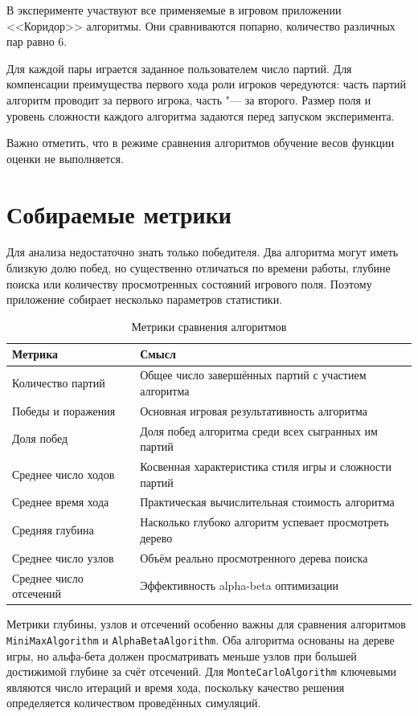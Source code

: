 \documentclass[a4paper,12pt]{diplom}
\begin{document}
В эксперименте участвуют все применяемые в игровом приложении <<Коридор>> алгоритмы. Они сравниваются попарно, количество различных пар равно $6$.

Для каждой пары играется заданное пользователем число партий. Для компенсации преимущества первого хода роли игроков чередуются: часть партий алгоритм проводит за первого игрока, часть "--- за второго. Размер поля и уровень сложности каждого алгоритма задаются перед запуском эксперимента.

Важно отметить, что в режиме сравнения алгоритмов обучение весов функции оценки не выполняется.

\section{Собираемые метрики}

Для анализа недостаточно знать только победителя. Два алгоритма могут иметь близкую долю побед, но существенно отличаться по времени работы, глубине поиска или количеству просмотренных состояний игрового поля. Поэтому приложение собирает несколько параметров статистики.

\begin{table}[h]
\centering
\caption{Метрики сравнения алгоритмов}
\label{tab:comparison_metrics}
\begin{tabular}{lp{9cm}}
\toprule
Метрика & Смысл \\
\midrule
Количество партий & Общее число завершённых партий с участием алгоритма \\
Победы и поражения & Основная игровая результативность алгоритма \\
Доля побед & Доля побед алгоритма среди всех сыгранных им партий \\
Среднее число ходов & Косвенная характеристика стиля игры и сложности партий \\
Среднее время хода & Практическая вычислительная стоимость алгоритма \\
Средняя глубина & Насколько глубоко алгоритм успевает просмотреть дерево \\
Среднее число узлов & Объём реально просмотренного дерева поиска \\
Среднее число отсечений & Эффективность alpha-beta оптимизации \\
\bottomrule
\end{tabular}
\end{table}

Метрики глубины, узлов и отсечений особенно важны для сравнения алгоритмов \texttt{MiniMaxAlgorithm} и \texttt{AlphaBetaAlgorithm}. Оба алгоритма основаны на дереве игры, но альфа-бета должен просматривать меньше узлов при большей достижимой глубине за счёт отсечений. Для \texttt{MonteCarloAlgorithm} ключевыми являются число итераций и время хода, поскольку качество решения определяется количеством проведённых симуляций.
\end{document}
